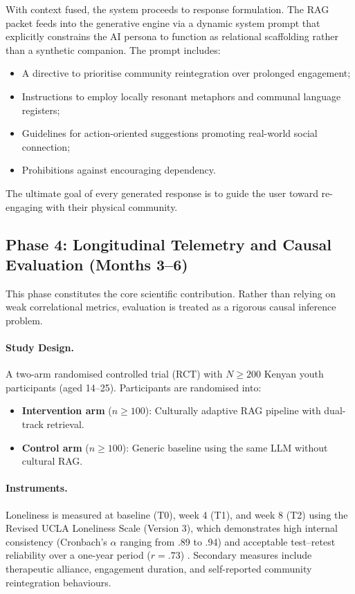 \documentclass[12pt,a4paper]{article}
\begin{document}
With context fused, the system proceeds to response formulation. The RAG packet feeds into the generative engine via a dynamic system prompt that explicitly constrains the AI persona to function as relational scaffolding rather than a synthetic companion. The prompt includes:

\begin{itemize}
  \item A directive to prioritise community reintegration over prolonged engagement;
  \item Instructions to employ locally resonant metaphors and communal language registers;
  \item Guidelines for action-oriented suggestions promoting real-world social connection;
  \item Prohibitions against encouraging dependency.
\end{itemize}

The ultimate goal of every generated response is to guide the user toward re-engaging with their physical community.

\subsection{Phase 4: Longitudinal Telemetry and Causal Evaluation (Months 3--6)}

This phase constitutes the core scientific contribution. Rather than relying on weak correlational metrics, evaluation is treated as a rigorous causal inference problem.

\paragraph{Study Design.}
A two-arm randomised controlled trial (RCT) with $N \geq 200$ Kenyan youth participants (aged 14--25). Participants are randomised into:

\begin{itemize}
  \item \textbf{Intervention arm} ($n \geq 100$): Culturally adaptive RAG pipeline with dual-track retrieval.
  \item \textbf{Control arm} ($n \geq 100$): Generic baseline using the same LLM without cultural RAG.
\end{itemize}

\paragraph{Instruments.}
Loneliness is measured at baseline (T0), week 4 (T1), and week 8 (T2) using the Revised UCLA Loneliness Scale (Version 3), which demonstrates high internal consistency (Cronbach's $\alpha$ ranging from .89 to .94) and acceptable test--retest reliability over a one-year period ($r = .73$) \citep{Russell1996}. Secondary measures include therapeutic alliance, engagement duration, and self-reported community reintegration behaviours.
\end{document}
